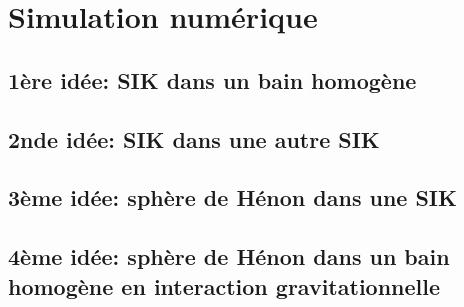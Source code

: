


\chapter{Simulation numérique}
	\minitoc
	\section[1ère idée]{1ère idée: SIK dans un bain homogène}
		
	\section[2nde idée]{2nde idée: SIK dans une autre SIK}
		
	\section[3ème idée]{3ème idée: sphère de Hénon dans une SIK}
		
	\section[4ème idée]{4ème idée: sphère de Hénon dans un bain homogène en interaction gravitationnelle}
		\label{Simu::Idee4}
		

